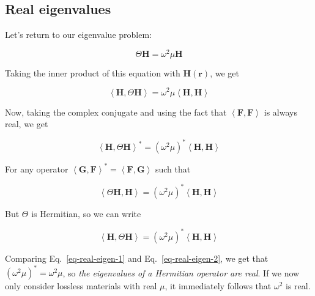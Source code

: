 
\subsection{Real eigenvalues}

Let's return to our eigenvalue problem:

\begin{equation}
\Theta {\mathbf H} = \omega^2 \mu {\mathbf H}
\end{equation} 

Taking the inner product of this equation with ${\mathbf H({\mathbf r})}$, we get

\begin{equation}
\left\langle{\mathbf H} , \Theta {\mathbf H}\right\rangle  = \omega^2 \mu \left\langle {\mathbf H} , {\mathbf H}\right\rangle \label{eq-real-eigen-1}
\end{equation}

Now, taking the complex conjugate and using the fact that $\left\langle {\mathbf F}, {\mathbf F}\right\rangle$ is always real, we get

\begin{equation}
\left\langle{\mathbf H} , \Theta {\mathbf H}\right\rangle^*  = (\omega^2 \mu)^* \left\langle {\mathbf H} , {\mathbf H}\right\rangle 
\end{equation} 

For any operator $\left\langle {\mathbf G}, {\mathbf F}\right\rangle ^*  = \left\langle {\mathbf F}, {\mathbf G}\right\rangle$ such that

\begin{equation}
\left\langle \Theta {\mathbf H} , {\mathbf H} \right\rangle  = (\omega^2 \mu)^* \left\langle {\mathbf H} , {\mathbf H}\right\rangle 
\end{equation} 

But $\Theta$ is Hermitian, so we can write

\begin{equation}
\left\langle {\mathbf H} , \Theta {\mathbf H} \right\rangle  = (\omega^2 \mu)^* \left\langle {\mathbf H} , {\mathbf H}\right\rangle \label{eq-real-eigen-2}
\end{equation} 

Comparing Eq.~\ref{eq-real-eigen-1} and Eq.~\ref{eq-real-eigen-2}, we get that $(\omega^2 \mu)^* = \omega^2 \mu$, so \emph{the eigenvalues of a Hermitian operator are real}. If we now only consider lossless materials with real $\mu$, it immediately follows that $\omega^2$ is real.

